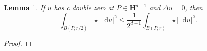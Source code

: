 \documentclass[reqno,12pt,letterpaper]{amsart}
\newcommand{\RR}{\mathbf{R}}
\newcommand{\Hyp}{\mathbf H}
\newcommand*\dif{\mathop{}\!\mathrm{d}}
\newcommand{\dfn}[1]{\emph{#1}\index{#1}}
\newtheorem{lemma}[theorem]{Lemma}
\theoremstyle{definition}
\newtheorem{definition}[theorem]{Definition}
\numberwithin{equation}{section}
\begin{document}
\begin{lemma}
If $u$ has a double zero at $P \in \Hyp^{d - 1}$ and $\Delta u = 0$, then
$$\int_{B(P, r/2)} \star |\dif u|^2 \leq \frac{1}{2^{d + 1}} \int_{B(P, r)} \star |\dif u|^2.$$
\end{lemma}
\begin{proof}

\end{proof}





\end{document}
